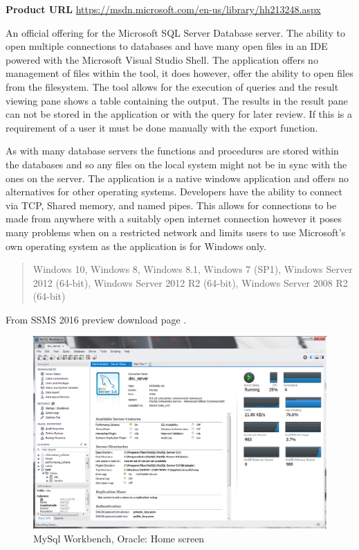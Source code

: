 \noindent

\textbf{Product URL}\cite{ssms}
\url{https://msdn.microsoft.com/en-us/library/hh213248.aspx}



An official offering for the Microsoft SQL Server Database server. The ability
to open multiple connections to databases and have many open files in an IDE
powered with the Microsoft Visual Studio Shell\cite{vsshell}. The application
offers no management of files within the tool, it does however, offer the
ability to open files from the filesystem. The tool allows for the execution of
queries and the result viewing pane shows a table containing the output. The
results in the result pane can not be stored in the application or with the
query for later review. If this is a requirement of a user it must be done
manually with the export function.

As with many database servers the functions and procedures are stored within the
databases and so any files on the local system might not be in sync with the
ones on the server. The application is a native windows application and offers
no alternatives for other operating systems. Developers have the ability to
connect via TCP, Shared memory, and named pipes. This allows for connections to
be made from anywhere with a suitably open internet connection however it poses
many problems when on a restricted network and limits users to use Microsoft's
own operating system as the application is for Windows only.

\blockquote{Windows 10, Windows 8, Windows 8.1, Windows 7 (SP1), Windows Server 2012 (64-bit), Windows Server 2012 R2 (64-bit), Windows Server 2008 R2 (64-bit)}

From SSMS 2016 preview download page \cite{ssmsdownload}.


\begin{figure}
  \includegraphics[width=\linewidth]{Figures/MySqlWorkbench.png}
  \caption{MySql Workbench, Oracle: Home screen}
  \label{fig:mysqlworkbench}
\end{figure}

